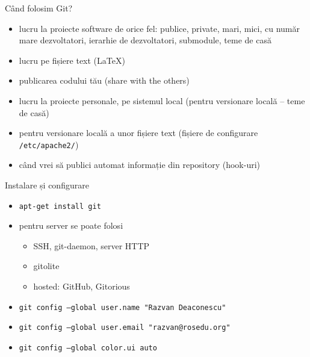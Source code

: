 \documentclass{beamer}
\begin{document}
\begin{frame}{Când folosim Git?}
  \begin{itemize}
    \item lucru la proiecte software de orice fel: publice, private, mari,
    mici, cu număr mare dezvoltatori, ierarhie de dezvoltatori, submodule,
    teme de casă
    \item lucru pe fișiere text (LaTeX)
    \item publicarea codului tău (share with the others)
    \item lucru la proiecte personale, pe sistemul local (pentru versionare
    locală -- teme de casă)
    \item pentru versionare locală a unor fișiere text (fișiere de configurare
    \texttt{/etc/apache2/})
    \item când vrei să publici automat informație din repository (hook-uri)
  \end{itemize}
\end{frame}

\begin{frame}{Instalare și configurare}
  \begin{itemize}
    \item \texttt{apt-get install git}
    \item pentru server se poate folosi
      \begin{itemize}
        \item SSH, git-daemon, server HTTP
        \item gitolite
        \item hosted: GitHub, Gitorious
      \end{itemize}
    \item \texttt{git config --global user.name "Razvan Deaconescu"}
    \item \texttt{git config --global user.email "razvan@rosedu.org"}
    \item \texttt{git config --global color.ui auto}
  \end{itemize}
\end{frame}
\end{document}
